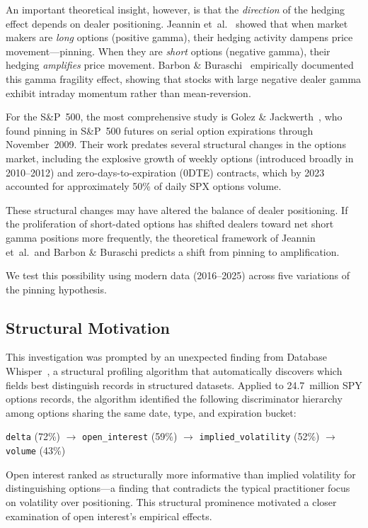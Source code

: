 \documentclass[11pt]{article}
\begin{document}
An important theoretical insight, however, is that the \textit{direction} of the hedging effect depends on dealer positioning. Jeannin et~al.~\cite{jeannin2008} showed that when market makers are \textit{long} options (positive gamma), their hedging activity dampens price movement---pinning. When they are \textit{short} options (negative gamma), their hedging \textit{amplifies} price movement. Barbon \& Buraschi~\cite{barbon2021} empirically documented this gamma fragility effect, showing that stocks with large negative dealer gamma exhibit intraday momentum rather than mean-reversion.

For the S\&P~500, the most comprehensive study is Golez \& Jackwerth~\cite{golez2012}, who found pinning in S\&P~500 futures on serial option expirations through November~2009. Their work predates several structural changes in the options market, including the explosive growth of weekly options (introduced broadly in 2010--2012) and zero-days-to-expiration (0DTE) contracts, which by 2023 accounted for approximately 50\% of daily SPX options volume.

These structural changes may have altered the balance of dealer positioning. If the proliferation of short-dated options has shifted dealers toward net short gamma positions more frequently, the theoretical framework of Jeannin et~al.\ and Barbon \& Buraschi predicts a shift from pinning to amplification.

We test this possibility using modern data (2016--2025) across five variations of the pinning hypothesis.

\subsection{Structural Motivation}

This investigation was prompted by an unexpected finding from Database Whisper~\cite{elms2026dw}, a structural profiling algorithm that automatically discovers which fields best distinguish records in structured datasets. Applied to 24.7~million SPY options records, the algorithm identified the following discriminator hierarchy among options sharing the same date, type, and expiration bucket:

\begin{center}
\texttt{delta} (72\%) $\to$ \texttt{open\_interest} (59\%) $\to$ \texttt{implied\_volatility} (52\%) $\to$ \texttt{volume} (43\%)
\end{center}

Open interest ranked as structurally more informative than implied volatility for distinguishing options---a finding that contradicts the typical practitioner focus on volatility over positioning. This structural prominence motivated a closer examination of open interest's empirical effects.
\end{document}
